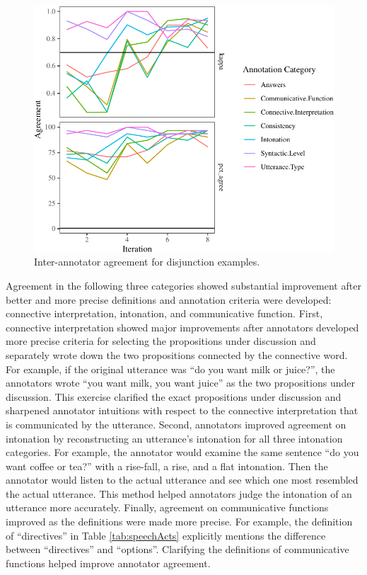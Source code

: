 \documentclass[
  ,man,floatsintext]{apa6}
\begin{document}
\begin{figure}[H]

{\centering \includegraphics{figs/oReliabilityPlot-1} 

}

\caption{Inter-annotator agreement for disjunction examples.}\label{fig:oReliabilityPlot}
\end{figure}

Agreement in the following three categories showed substantial improvement after better and more precise definitions and annotation criteria were developed: connective interpretation, intonation, and communicative function. First, connective interpretation showed major improvements after annotators developed more precise criteria for selecting the propositions under discussion and separately wrote down the two propositions connected by the connective word. For example, if the original utterance was ``do you want milk or juice?'', the annotators wrote ``you want milk, you want juice'' as the two propositions under discussion. This exercise clarified the exact propositions under discussion and sharpened annotator intuitions with respect to the connective interpretation that is communicated by the utterance. Second, annotators improved agreement on intonation by reconstructing an utterance's intonation for all three intonation categories. For example, the annotator would examine the same sentence ``do you want coffee or tea?'' with a rise-fall, a rise, and a flat intonation. Then the annotator would listen to the actual utterance and see which one most resembled the actual utterance. This method helped annotators judge the intonation of an utterance more accurately. Finally, agreement on communicative functions improved as the definitions were made more precise. For example, the definition of ``directives'' in Table \ref{tab:speechActs} explicitly mentions the difference between ``directives'' and ``options''. Clarifying the definitions of communicative functions helped improve annotator agreement.
\end{document}
